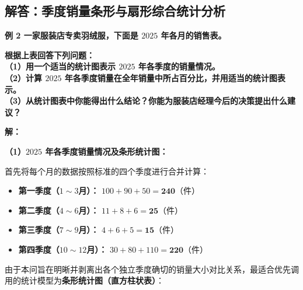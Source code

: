 ﻿%

\subsection{解答：季度销量条形与扇形综合统计分析}

\vspace{0.6cm}

\textbf{例 2 \quad 一家服装店专卖羽绒服，下面是 $2025$ 年各月的销售表。}

\vspace{0.2cm}
\begin{center}
\renewcommand{\arraystretch}{1.6}
\end{center}

\vspace{0.4cm}

\textbf{根据上表回答下列问题：\\
（1）用一个适当的统计图表示 $2025$ 年各季度的销量情况。\\
（2）计算 $2025$ 年各季度销量在全年销量中所占百分比，并用适当的统计图表示。\\
（3）从统计图表中你能得出什么结论？你能为服装店经理今后的决策提出什么建议？}

\vspace{0.4cm}
\textbf{解：}

\textbf{（1）$2025$ 年各季度销量情况及条形统计图：}

\vspace{0.2cm}
首先将每个月的数据按照标准的四个季度进行合并计算：
\begin{itemize}
    \item \textbf{第一季度（$1{\sim}3$月）：} $100 + 90 + 50 = \boldsymbol{240}$（件）
    \item \textbf{第二季度（$4{\sim}6$月）：} $11 + 8 + 6 = \boldsymbol{25}$（件）
    \item \textbf{第三季度（$7{\sim}9$月）：} $4 + 6 + 5 = \boldsymbol{15}$（件）
    \item \textbf{第四季度（$10{\sim}12$月）：} $30 + 80 + 110 = \boldsymbol{220}$（件）
\end{itemize}
由于本问旨在明晰并剥离出各个独立季度确切的销量大小对比关系，最适合优先调用的统计模型为\textbf{条形统计图（直方柱状表）}：


